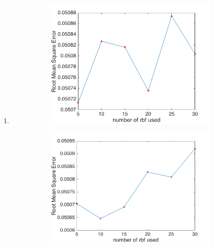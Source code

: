 \documentclass{article}
\begin{document}
			\begin{enumerate}[label=(\alph*)]
				\item
				 	\begin{figure}[htbp]
				 		\caption{Root Mean Square Error against number of radial basis functions used}
				 		\begin{subfigure}{0.5\textwidth}
				 			\includegraphics[width=\linewidth]{images/p1-3-a_5_30.png}
				 			\caption{}
				 			\label{fig:p-1-3-a_a}
			 			\end{subfigure}
				 		\begin{subfigure}{0.5\textwidth}
				 			\includegraphics[width=\linewidth]{images/p1-3-a_5_30_another.png}
				 			\caption{}
				 			\label{fig:p-1-3-a_b}
				 		\end{subfigure}\\

\end{figure}
\end{enumerate}
\end{document}
